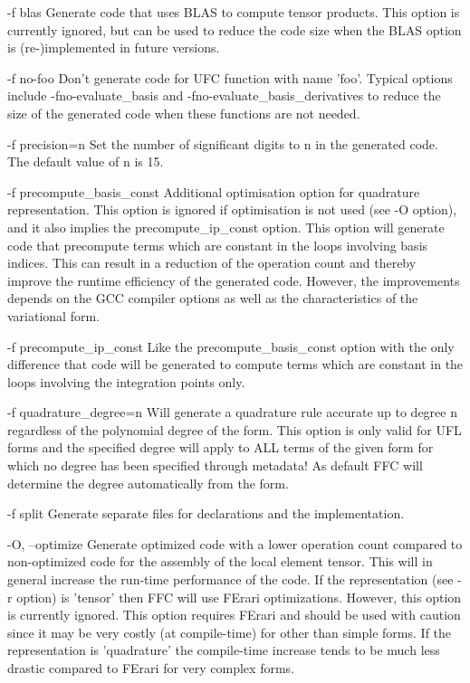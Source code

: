        -f blas
              Generate code that uses BLAS to compute tensor products.
              This option is currently ignored, but can be  used to reduce the
              code size when the BLAS option is (re-)implemented in future
              versions.

       -f no-foo
              Don't  generate code for UFC function with name 'foo'. Typical
              options include -fno-evaluate_basis and
              -fno-evaluate_basis_derivatives to reduce the size of the
              generated code when these functions are not needed.

       -f precision=n
              Set the number of significant digits to n in the generated code.
              The default value of n is 15.

       -f precompute_basis_const
              Additional optimisation option for quadrature representation.
              This option is ignored if optimisation is  not used 
              (see  -O  option),  and it also implies the precompute_ip_const
              option. This option will generate code that precompute terms
              which are constant in the loops involving basis indices. This can
              result in  a  reduction  of  the operation count and thereby
              improve the runtime efficiency of the generated code. However,
              the improvements depends on the GCC compiler options as well as
              the characteristics of the variational form.

       -f precompute_ip_const
              Like the precompute_basis_const option with the only difference
              that code will be generated to compute terms which are constant
              in the loops involving the integration points only.

       -f quadrature_degree=n
              Will  generate  a  quadrature  rule accurate up to degree n
              regardless of the polynomial degree of the form. This option is
              only valid for UFL forms and the specified degree will apply to
              ALL terms of the  given  form for  which no degree has been
              specified through metadata! As default FFC will determine the
              degree automatically from the form.

       -f split
              Generate separate files for declarations and the implementation.

       -O, --optimize
              Generate optimized code with a lower operation  count compared to
              non-optimized code for the assembly of  the local element tensor.
              This  will  in  general increase the  run-time performance of the
              code. If  the representation (see -r option) is 'tensor' then FFC
              will use FErari optimizations. However, this option is  currently
              ignored. This  option  requires  FErari  and  should be used with
              caution since it may be very costly (at compile-time)  for  other
              than  simple  forms.  If the representation is  'quadrature'  the
              compile-time increase tends to be  much  less drastic compared to
              FErari for very complex forms.

